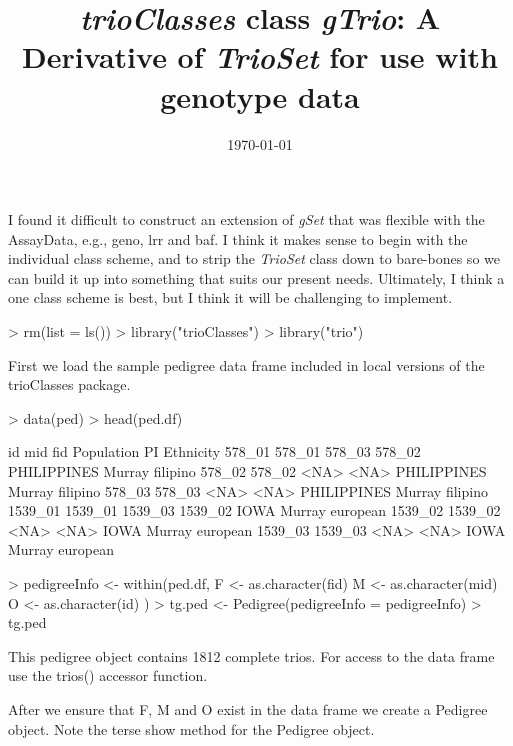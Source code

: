 \documentclass[10pt]{article}
\title{\emph{trioClasses} class \emph{gTrio}: A Derivative of \emph{TrioSet} for use with genotype data}
\date{\today}
\begin{document}
\setlength{\parskip}{0.2\baselineskip}
\setlength{\parindent}{0pt}
\maketitle
I found it difficult to construct an extension of \emph{gSet} that was flexible with the AssayData, e.g., geno, lrr and baf.  I think it makes sense to begin with the individual class scheme, and to strip the \emph{TrioSet} class down to bare-bones so we can build it up into something that suits our present needs.  Ultimately, I think a one class scheme is best, but I think it will be challenging to implement.
\begin{Schunk}
\begin{Sinput}
> rm(list = ls())
> library("trioClasses")
> library("trio")
\end{Sinput}
\end{Schunk}
First we load the sample pedigree data frame included in local versions of the trioClasses package.
\begin{Schunk}
\begin{Sinput}
> data(ped)
> head(ped.df)
\end{Sinput}
\begin{Soutput}
             id     mid     fid  Population     PI Ethnicity
578_01   578_01  578_03  578_02 PHILIPPINES Murray  filipino
578_02   578_02    <NA>    <NA> PHILIPPINES Murray  filipino
578_03   578_03    <NA>    <NA> PHILIPPINES Murray  filipino
1539_01 1539_01 1539_03 1539_02        IOWA Murray  european
1539_02 1539_02    <NA>    <NA>        IOWA Murray  european
1539_03 1539_03    <NA>    <NA>        IOWA Murray  european
\end{Soutput}
\begin{Sinput}
> pedigreeInfo <- within(ped.df, {
     F <- as.character(fid)
     M <- as.character(mid)
     O <- as.character(id)
 })
> tg.ped <- Pedigree(pedigreeInfo = pedigreeInfo)
> tg.ped
\end{Sinput}
\begin{Soutput}
This pedigree object contains 1812 complete trios.
For access to the data frame use the trios() accessor function.
\end{Soutput}
\end{Schunk}
After we ensure that F, M and O exist in the data frame we create a Pedigree object.  Note the terse show method for the Pedigree object.
\end{document}
